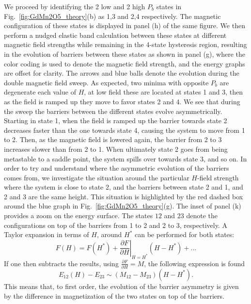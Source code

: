 We proceed by identifying the 2 low and 2 high $P_b$ states in Fig.~\ref{fig:GdMn2O5_theory}(b) as 1,3 and 2,4 respectively.
The magnetic configuration of these states is displayed in panel (h) of the same figure.
We then perform a nudged elastic band calculation between these states at different magnetic field strengths while remaining in the 4-state hysteresis region, resulting in the evolution of barriers between these states as shown in panel (g), where the color coding is used to denote the magnetic field strength, and the energy graphs are offset for clarity.
The arrows and blue balls denote the evolution during the double magnetic field sweep. As expected, two minima with opposite $P_b$ are degenerate each value of $H$, at low field these are located at states 1 and 3, then as the field is ramped up they move to favor states 2 and 4.
We see that during the sweep the barriers between the different states evolve asymmetrically.
Starting in state 1, when the field is ramped up the barrier towards state 2 decreases faster than the one towards state 4, causing the system to move from 1 to 2.
Then, as the magnetic field is lowered again, the barrier from 2 to 3 increases slower than from 2 to 1. When ultimately state 2 goes from being metastable to a saddle point, the system spills over towards state 3, and so on.
In order to try and understand where the asymmetric evolution of the barriers comes from, we investigate the situation around the particular $H$-field strength where the system is close to state 2, and the barriers between state 2 and 1, and 2 and 3 are the same height.
This situation is highlighted by the red dashed box around the blue graph in Fig.~\ref{fig:GdMn2O5_theory}(g). The inset of panel (k) provides a zoom on the energy surface. The states $12$ and $23$ denote the configurations on top of the barriers from 1 to 2 and 2 to 3, respectively. A Taylor expansion in terms of $H$, around $H^*$ can be performed for both states:
\begin{equation}
	F(H) = F(H^*) + \left.\frac{\partial F}{\partial H}\right\rvert_{H=H^*} (H-H^*) + ...
\end{equation}
If one then subtracts the results, using $\frac{\partial F}{\partial H} = M$, the following expression is found
\begin{equation}
	E_{12}(H) - E_{23} \sim (M_{12} - M_{23}) (H - H^*).
\end{equation}
This means that, to first order, the evolution of the barrier asymmetry is given by the difference in magnetization of the two states on top of the barriers.
